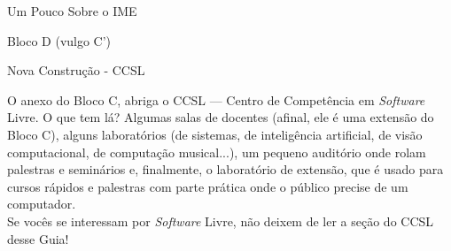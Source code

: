 \begin{secao}{Um Pouco Sobre o IME}
\begin{subsecao}{Bloco D (vulgo C')}
\end{subsecao}

\begin{subsecao}{Nova Construção - CCSL}

O anexo do Bloco C, abriga o CCSL --- Centro de Competência em \textit{Software} 
Livre. O que tem lá? Algumas salas de docentes (afinal, ele é uma extensão do 
Bloco C), alguns laboratórios (de sistemas, de inteligência artificial, 
de visão computacional, de computação musical...), um pequeno auditório 
onde rolam palestras e seminários e, finalmente, o laboratório de extensão, 
que é usado para cursos rápidos e palestras com parte prática onde o público 
precise de um computador.\\
Se vocês se interessam por \textit{Software} Livre, não deixem de ler a seção 
do CCSL desse Guia!

\end{subsecao}
\end{secao}
